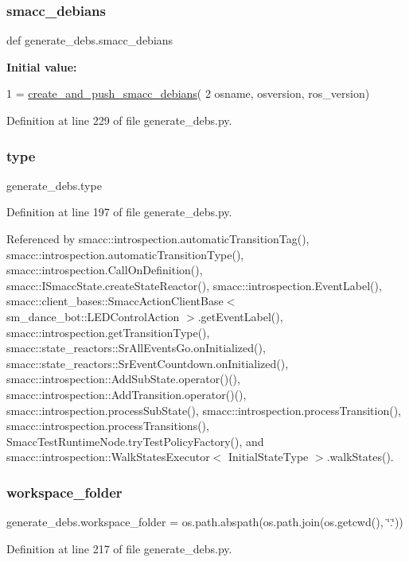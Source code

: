 \subsubsection{\texorpdfstring{smacc\+\_\+debians}{smacc\_debians}}
{\footnotesize\ttfamily def generate\+\_\+debs.\+smacc\+\_\+debians}

{\bfseries Initial value\+:}
\begin{DoxyCode}
1 =  \hyperlink{namespacegenerate__debs_af7237c463c8e5b4df369e6befc154c50}{create\_and\_push\_smacc\_debians}(
2         osname, osversion, ros\_version)
\end{DoxyCode}


Definition at line 229 of file generate\+\_\+debs.\+py.

\mbox{\label{namespacegenerate__debs_a50bc9a7ecac9584553e089a448bcde58}} 
\subsubsection{\texorpdfstring{type}{type}}
{\footnotesize\ttfamily generate\+\_\+debs.\+type}



Definition at line 197 of file generate\+\_\+debs.\+py.



Referenced by smacc\+::introspection.\+automatic\+Transition\+Tag(), smacc\+::introspection.\+automatic\+Transition\+Type(), smacc\+::introspection.\+Call\+On\+Definition(), smacc\+::\+I\+Smacc\+State.\+create\+State\+Reactor(), smacc\+::introspection.\+Event\+Label(), smacc\+::client\+\_\+bases\+::\+Smacc\+Action\+Client\+Base$<$ sm\+\_\+dance\+\_\+bot\+::\+L\+E\+D\+Control\+Action $>$.\+get\+Event\+Label(), smacc\+::introspection.\+get\+Transition\+Type(), smacc\+::state\+\_\+reactors\+::\+Sr\+All\+Events\+Go.\+on\+Initialized(), smacc\+::state\+\_\+reactors\+::\+Sr\+Event\+Countdown.\+on\+Initialized(), smacc\+::introspection\+::\+Add\+Sub\+State.\+operator()(), smacc\+::introspection\+::\+Add\+Transition.\+operator()(), smacc\+::introspection.\+process\+Sub\+State(), smacc\+::introspection.\+process\+Transition(), smacc\+::introspection.\+process\+Transitions(), Smacc\+Test\+Runtime\+Node.\+try\+Test\+Policy\+Factory(), and smacc\+::introspection\+::\+Walk\+States\+Executor$<$ Initial\+State\+Type $>$.\+walk\+States().

\mbox{\label{namespacegenerate__debs_acb69863b90257249a30e43ebacfb8bd8}} 
\subsubsection{\texorpdfstring{workspace\+\_\+folder}{workspace\_folder}}
{\footnotesize\ttfamily generate\+\_\+debs.\+workspace\+\_\+folder = os.\+path.\+abspath(os.\+path.\+join(os.\+getcwd(), \char`\"{}.\char`\"{}))}



Definition at line 217 of file generate\+\_\+debs.\+py.

